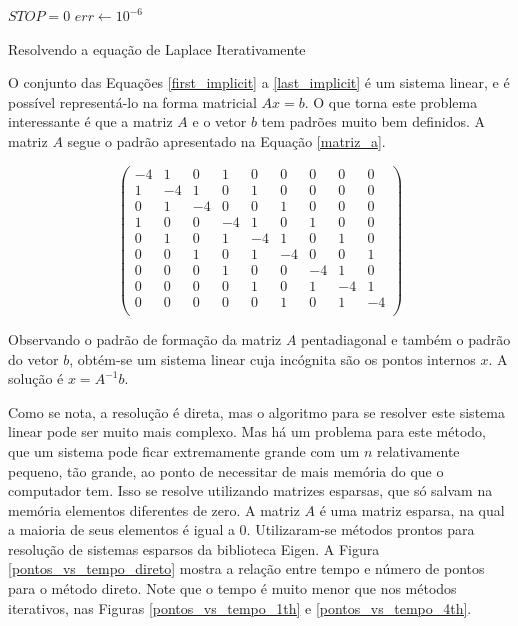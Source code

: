 \documentclass[journal]{IEEEtran}
\begin{document}
\begin{algorithm}
\BlankLine
$STOP=0$\;
$err \leftarrow 10^{-6}$\;

\caption{Resolvendo a equação de Laplace Iterativamente}\label{algo_laplace_iter}
\end{algorithm}

O conjunto das Equações \ref{first_implicit} a \ref{last_implicit} é um sistema linear, e é possível representá-lo na forma matricial $Ax = b$. O que torna este problema interessante é que a matriz $A$ e o vetor $b$ tem padrões muito bem definidos. A matriz $A$ segue o padrão apresentado na Equação \ref{matriz_a}.

\begin{equation}
\left( \begin{array}{ccccccccc}
-4 & 1 & 0 & 1 & 0 & 0 & 0 & 0 & 0 \\ %
1 & -4 & 1 & 0 & 1 & 0 & 0 & 0 & 0 \\ %
0 & 1 & -4 & 0 & 0 & 1 & 0 & 0 & 0 \\ %
1 & 0 & 0 & -4 & 1 & 0 & 1 & 0 & 0 \\ %
0 & 1 & 0 & 1 & -4 & 1 & 0 & 1 & 0 \\ %
0 & 0 & 1 & 0 & 1 & -4 & 0 & 0 & 1 \\ %
0 & 0 & 0 & 1 & 0 & 0 & -4 & 1 & 0 \\ %
0 & 0 & 0 & 0 & 1 & 0 & 1 & -4 & 1 \\ %
0 & 0 & 0 & 0 & 0 & 1 & 0 & 1 & -4 \\ %
\end{array} \right) \label{matriz_a}
\end{equation}

Observando o padrão de formação da matriz $A$ pentadiagonal e também o padrão do vetor $b$, obtém-se um sistema linear cuja incógnita são os pontos internos $x$. A solução é $x=A^{-1}b$.

Como se nota, a resolução é direta, mas o algoritmo para se resolver este sistema linear pode ser muito mais complexo. Mas há um problema para este método, que um sistema pode ficar extremamente grande com um $n$ relativamente pequeno, tão grande, ao ponto de necessitar de mais memória do que o computador tem. Isso se resolve utilizando matrizes esparsas, que só salvam na memória elementos diferentes de zero. A matriz $A$ é uma matriz esparsa, na qual a maioria de seus elementos é igual a 0. Utilizaram-se métodos prontos para resolução de sistemas esparsos da biblioteca Eigen. A Figura \ref{pontos_vs_tempo_direto} mostra a relação entre tempo e número de pontos para o método direto. Note que o tempo é muito menor que nos métodos iterativos, nas Figuras \ref{pontos_vs_tempo_1th} e \ref{pontos_vs_tempo_4th}.
\end{document}
